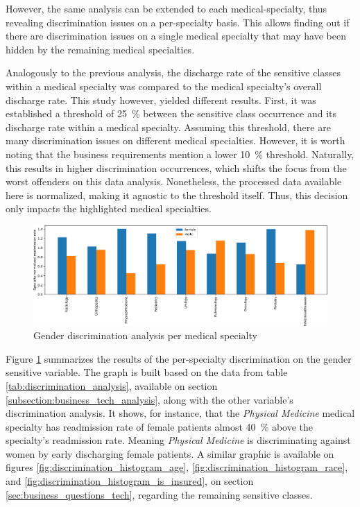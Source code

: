 \documentclass[a4paper,11pt]{article}
\begin{document}
However, the same analysis can be extended to each medical-specialty, thus revealing discrimination issues on a per-specialty basis. This allows finding out if there are discrimination issues on a single medical specialty that may have been hidden by the remaining medical specialties.

Analogously to the previous analysis, the discharge rate of the sensitive classes within a medical specialty was compared to the medical specialty's overall discharge rate. This study however, yielded different results. First, it was established a threshold of \SI{25}{\percent} between the sensitive class occurrence and its discharge rate within a medical specialty. 
Assuming this threshold, there are many discrimination issues on different medical specialties.
However, it is worth noting that the business requirements mention a lower \SI{10}{\percent} threshold. Naturally, this results in higher discrimination occurrences, which shifts the focus from the worst offenders on this data analysis. Nonetheless, the processed data available here is normalized, making it agnostic to the threshold itself. Thus, this decision only impacts the highlighted medical specialties. 


\begin{figure}[!htb]
	\centering
	\includegraphics[width=1\textwidth]{images/descrimination_histogram_gender.pdf}
	\caption{Gender discrimination analysis per medical specialty}
	\label{fig:discrimination_histogram_gender}
\end{figure}

Figure \ref{fig:discrimination_histogram_gender} summarizes the results of the per-specialty discrimination on the gender sensitive variable. The graph is built based on the data from table \ref{tab:discrimination_analysis}, available on section \ref{subsection:business_tech_analysis}, along with the other variable's discrimination analysis. It shows, for instance, that the \textit{Physical Medicine} medical specialty has readmission rate of female patients almost \SI{40}{\percent} above the specialty's readmission rate. Meaning \textit{Physical Medicine} is discriminating against women by early discharging female patients.
A similar graphic is available on figures \ref{fig:discrimination_histogram_age}, \ref{fig:discrimination_histogram_race}, and \ref{fig:discrimination_histogram_is_insured}, on section \ref{sec:business_questions_tech}, regarding the remaining sensitive classes.
\end{document}
